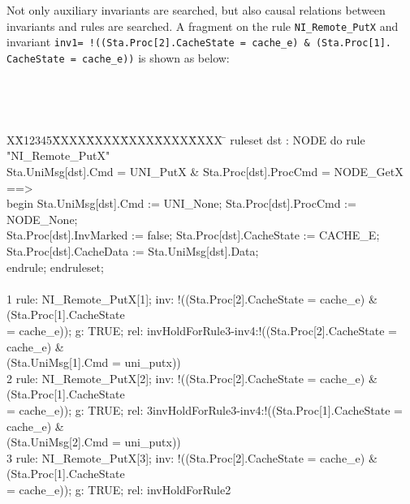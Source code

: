 \documentclass{llncs-new}
\newlength{\fminilength}
\newenvironment{fmini}[1][\linewidth]
  {\setlength{\fminilength}{#1\fboxsep-2\fboxrule}%
   \vspace{2ex}\noindent\begin{lrbox}{\fminibox}\begin{minipage}{\fminilength}%
   \mbox{ }\hfill\vspace{-2.5ex}}%
  {\end{minipage}\end{lrbox}\vspace{1ex}\hspace{0ex}%
   \framebox{\usebox{\fminibox}}}
\newenvironment{specification}
{\noindent\scriptsize
\tt\begin{fmini}\begin{tabbing}X\=X12345\=XXXX\=XXXX\=XXXX\=XXXX\=XXXX
\=\+\kill} {\end{tabbing}\normalfont\end{fmini}}
\begin{document}
Not only auxiliary invariants are searched, but also causal relations between   invariants and  rules are searched. A fragment on the rule {\tt NI\_Remote\_PutX} and invariant {\tt inv1= !((Sta.Proc[2].CacheState = cache\_e) \& (Sta.Proc[1].\ \\CacheState = cache\_e))} is shown as below:\\
\vspace{-0.3cm}

\begin{specification}
ruleset dst : NODE do rule "NI\_Remote\_PutX"\\
  Sta.UniMsg[dst].Cmd = UNI\_PutX \&  Sta.Proc[dst].ProcCmd = NODE\_GetX ==>\\
begin   Sta.UniMsg[dst].Cmd := UNI\_None;  Sta.Proc[dst].ProcCmd := NODE\_None;\\
  Sta.Proc[dst].InvMarked := false;   Sta.Proc[dst].CacheState := CACHE\_E;\\
  Sta.Proc[dst].CacheData := Sta.UniMsg[dst].Data;\\
endrule; endruleset;\\\\
1 rule: NI\_Remote\_PutX[1]; inv: !((Sta.Proc[2].CacheState = cache\_e) \& (Sta.Proc[1].CacheState\\ = cache\_e)); g: TRUE;
rel: invHoldForRule3-inv4:!((Sta.Proc[2].CacheState = cache\_e) \& \\(Sta.UniMsg[1].Cmd = uni\_putx))\\
2 rule: NI\_Remote\_PutX[2]; inv: !((Sta.Proc[2].CacheState = cache\_e) \& (Sta.Proc[1].CacheState\\ = cache\_e)); g: TRUE;
rel: 3invHoldForRule3-inv4:!((Sta.Proc[1].CacheState = cache\_e) \& \\(Sta.UniMsg[2].Cmd = uni\_putx))\\
3 rule: NI\_Remote\_PutX[3]; inv: !((Sta.Proc[2].CacheState = cache\_e) \& (Sta.Proc[1].CacheState\\ = cache\_e)); g: TRUE;
 rel: invHoldForRule2
\end{specification}
\end{document}
